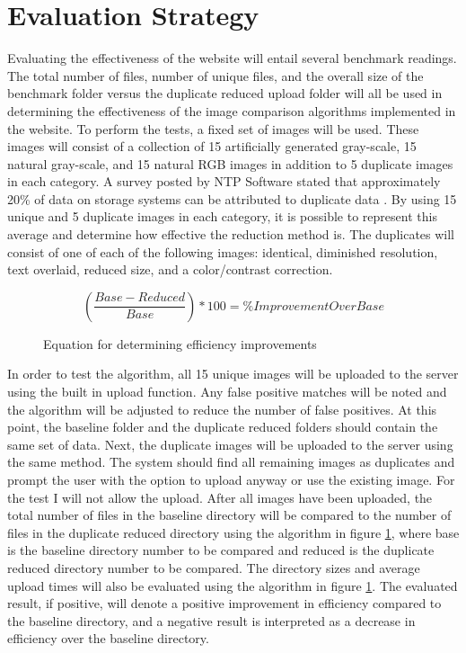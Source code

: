\documentclass[11pt]{article}
\begin{document}
\vspace*{-.2in}
\section{Evaluation Strategy}
\label{sec:evaluate}
\vspace*{-.1in}


Evaluating the effectiveness of the website will entail several benchmark readings. The total number of files, number of unique files, and the overall size of the benchmark folder versus the duplicate reduced upload folder will all be used in determining the effectiveness of the image comparison algorithms implemented in the website. To perform the tests, a fixed set of images will be used. These images will consist of a collection of 15 artificially generated gray-scale, 15 natural gray-scale, and 15 natural RGB images in addition to 5 duplicate images in each category. A survey posted by NTP Software stated that approximately 20\% of data on storage systems can be attributed to duplicate data \cite{ntps:staledata}. By using 15 unique and 5 duplicate images in each category, it is possible to represent this average and determine how effective the reduction method is. The duplicates will consist of one of each of the following images: identical, diminished resolution, text overlaid, reduced size, and a color/contrast correction.

\begin{figure}[htbp]
\centering
\[\left ( \frac{Base - Reduced}{Base} \right ) * 100 = \% Improvement Over Base\]
\caption{Equation for determining efficiency improvements}
\label{benchmark_eq}
\end{figure}

In order to test the algorithm, all 15 unique images will be uploaded to the server using the built in upload function. Any false positive matches will be noted and the algorithm will be adjusted to reduce the number of false positives. At this point, the baseline folder and the duplicate reduced folders should contain the same set of data. Next, the duplicate images will be uploaded to the server using the same method. The system should find all remaining images as duplicates and prompt the user with the option to upload anyway or use the existing image. For the test I will not allow the upload. After all images have been uploaded, the total number of files in the baseline directory will be compared to the number of files in the duplicate reduced directory using the algorithm in figure \ref{benchmark_eq}, where base is the baseline directory number to be compared and reduced is the duplicate reduced directory number to be compared.  The directory sizes and average upload times will also be evaluated using the algorithm in figure \ref{benchmark_eq}. The evaluated result, if positive, will denote a positive improvement in efficiency compared to the baseline directory, and a negative result is interpreted as a decrease in efficiency over the baseline directory.
\end{document}
